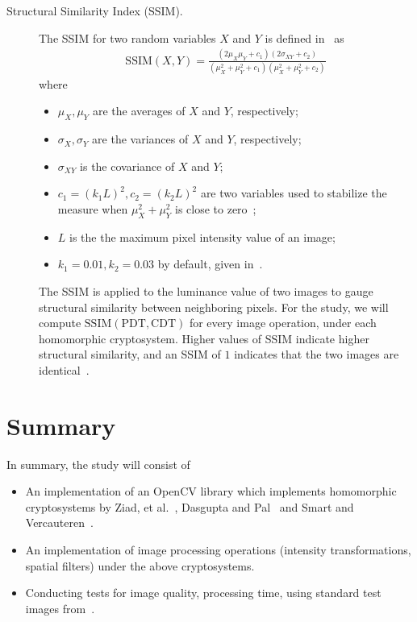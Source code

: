 \begin{description}
	\item [Structural Similarity Index (SSIM).]
	The SSIM for two random variables $X$ and $Y$ is defined in~\cite{ahmed_benchmark_2016, akramullah_video_2014} as
	\begin{align}
        \mathrm{SSIM}(X,Y) = \frac{(2\mu_X\mu_Y+c_1)(2\sigma_{XY}+c_2)}{(\mu_X^2+\mu_Y^2+c_1)(\mu_X^2+\mu_Y^2+c_2)}
	\end{align}
	where
	\begin{itemize}
		\item $\mu_X, \mu_Y$ are the averages of $X$ and $Y$, respectively;
		\item $\sigma_X, \sigma_Y$ are the variances of $X$ and $Y$, respectively;
		\item $\sigma_{XY}$ is the covariance of $X$ and $Y$;
		\item $c_1 = (k_1L)^2, c_2 = (k_2L)^2$ are two variables used to stabilize the measure when $\mu_X^2+\mu_Y^2$ is close to zero~\cite{akramullah_video_2014};
		\item $L$ is the the maximum pixel intensity value of an image;
		\item $k_1 = 0.01, k_2 = 0.03$ by default, given in~\cite{ahmed_benchmark_2016}.
	\end{itemize}
	The SSIM is applied to the luminance value of two images to gauge structural similarity between neighboring pixels.
    For the study, we will compute $\mathrm{SSIM}(\mathrm{PDT}, \mathrm{CDT})$ for every image operation, under each homomorphic cryptosystem. Higher values of SSIM indicate higher structural similarity, and an SSIM of $1$ indicates that the two images are identical~\cite{ahmed_benchmark_2016}.
\end{description}

\section{Summary}

In summary, the study will consist of
\begin{itemize}
	\item An implementation of an OpenCV library which implements homomorphic cryptosystems by Ziad, et al.~\cite{ziad_cryptoimg:_2016}, Dasgupta and Pal~\cite{dasgupta_design_2016} and Smart and Vercauteren~\cite{hutchison_fully_2010}.
	\item An implementation of image processing operations (intensity transformations, spatial filters) under the above cryptosystems.
	\item Conducting tests for image quality, processing time, using standard test images from~\cite{gonzalez_image_nodate}.
\end{itemize}

